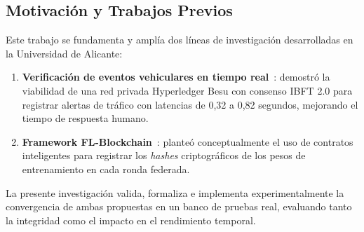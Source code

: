 \subsection{Motivación y Trabajos Previos}
Este trabajo se fundamenta y amplía dos líneas de investigación desarrolladas en la Universidad de Alicante:
\begin{enumerate}
    \item \textbf{Verificación de eventos vehiculares en tiempo real}~\cite{pujol2024blockchain}: demostró la viabilidad de una red privada Hyperledger Besu con consenso IBFT 2.0 para registrar alertas de tráfico con latencias de 0,32 a 0,82 segundos, mejorando el tiempo de respuesta humano.
    \item \textbf{Framework FL-Blockchain}~\cite{cloudlabaia_flblockchain}: planteó conceptualmente el uso de contratos inteligentes para registrar los \textit{hashes} criptográficos de los pesos de entrenamiento en cada ronda federada.
\end{enumerate}

La presente investigación valida, formaliza e implementa experimentalmente la convergencia de ambas propuestas en un banco de pruebas real, evaluando tanto la integridad como el impacto en el rendimiento temporal.

